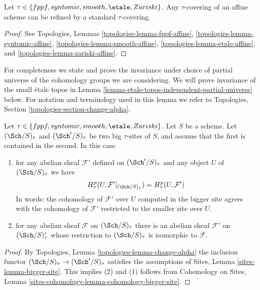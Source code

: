 \begin{lemma}
\label{lemma-tau-affine}
Let $\tau \in \{fppf, syntomic, smooth, \etale, Zariski\}$.
Any $\tau$-covering of an affine scheme can be refined by a
standard $\tau$-covering.
\end{lemma}

\begin{proof}
See
Topologies, Lemmas
\ref{topologies-lemma-fppf-affine},
\ref{topologies-lemma-syntomic-affine},
\ref{topologies-lemma-smooth-affine},
\ref{topologies-lemma-etale-affine}, and
\ref{topologies-lemma-zariski-affine}.
\end{proof}

\noindent
For completeness we state and prove the invariance under choice of partial
universe of the cohomology groups we are considering. We will prove invariance
of the small \'etale topos in
Lemma \ref{lemma-etale-topos-independent-partial-universe} below.
For notation and terminology used in this lemma we refer to
Topologies, Section \ref{topologies-section-change-alpha}.

\begin{lemma}
\label{lemma-cohomology-enlarge-partial-universe}
Let $\tau \in \{fppf, syntomic, smooth, \etale, Zariski\}$.
Let $S$ be a scheme.
Let $(\Sch/S)_\tau$ and $(\Sch'/S)_\tau$ be two
big $\tau$-sites of $S$, and assume that the first is contained in the second.
In this case
\begin{enumerate}
\item for any abelian sheaf $\mathcal{F}'$ defined on $(\Sch'/S)_\tau$ and
any object $U$ of $(\Sch/S)_\tau$ we have
$$
H^p_\tau(U, \mathcal{F}'|_{(\Sch/S)_\tau}) =
H^p_\tau(U, \mathcal{F}')
$$
In words: the cohomology of $\mathcal{F}'$ over $U$ computed in the bigger site
agrees with the cohomology of $\mathcal{F}'$ restricted to the smaller site
over $U$.
\item for any abelian sheaf $\mathcal{F}$ on $(\Sch/S)_\tau$ there is an
abelian sheaf $\mathcal{F}'$ on $(\Sch/S)_\tau'$ whose restriction to
$(\Sch/S)_\tau$ is isomorphic to $\mathcal{F}$.
\end{enumerate}
\end{lemma}

\begin{proof}
By Topologies, Lemma \ref{topologies-lemma-change-alpha} the inclusion functor
$(\Sch/S)_\tau \to (\Sch'/S)_\tau$ satisfies the assumptions of
Sites, Lemma \ref{sites-lemma-bigger-site}. This implies (2) and (1)
follows from
Cohomology on Sites, Lemma \ref{sites-cohomology-lemma-cohomology-bigger-site}.
\end{proof}




